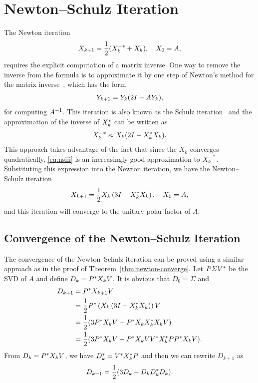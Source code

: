 \documentclass[12pt]{article}
\begin{document}
\section{Newton--Schulz Iteration}

The Newton iteration 
\begin{equation}
    \notag
    X_{k+1} = \frac 12(X_k^{-*} + X_k),\quad X_0 = A,
\end{equation}
requires the explicit computation of a matrix inverse. One way to remove the inverse from the formula is to approximate it by one step of Newton's method for the matrix inverse~, which has the form 
\begin{equation}
    \notag 
    Y_{k+1} = Y_k(2I - AY_k),
\end{equation}
for computing $A^{-1}$. This iteration is also known as the Schulz iteration~ and the approximation of the inverse of $X_k^*$ can be written as
\begin{equation}
    \label{eq:nsiii} 
    X_k^{-*} \approx X_k(2I - X_k^* X_k).
\end{equation}
This approach takes advantage of the fact that since the $X_k$ converges quadratically, \eqref{eq:nsiii} is an increasingly good approximation to $X_k^{-*}$. Substituting this expression into the Newton iteration, we have the Newton--Schulz iteration~ 
\begin{equation}
    \label{eq:ns-iteration}
    X_{k+1} = \frac 12 X_k\left(3I - X_k^* X_k\right), \quad X_0 = A,
\end{equation}
and this iteration will converge to the unitary polar factor of $A$.

\subsection{Convergence of the Newton--Schulz Iteration}
The convergence of the Newton--Schulz iteration can be proved 
using a similar approach as in the proof of Theorem~\ref{thm:newton-converge}. Let $P\varSigma V^*$ be the SVD of $A$ and define $D_k = P^* X_k V$. It is obvious that $D_0 = \Sigma$ and 
\begin{equation}
    \notag 
    \begin{aligned}
        D_{k+1} &= P^* X_{k+1} V\\
        & = \frac{1}{2}P^* \left(X_k\left(3I - X_k^* X_k\right)\right)V\\
        & = \frac{1}{2} (3P^* X_k V - P^* X_kX_k^* X_k V)\\
        & = \frac{1}{2} (3P^* X_k V - P^* X_k V V^* X_k^* P P^* X_k V).
    \end{aligned}
\end{equation}
From $D_k = P^* X_k V$, we have $D_k^* = V^* X_k^* P$ and then we can rewrite $D_{k+1}$ as
\begin{equation}
    \label{eq:ns-iter1}
    D_{k+1} = \frac{1}{2}(3D_k-D_kD_k^* D_k).
\end{equation}
\end{document}
